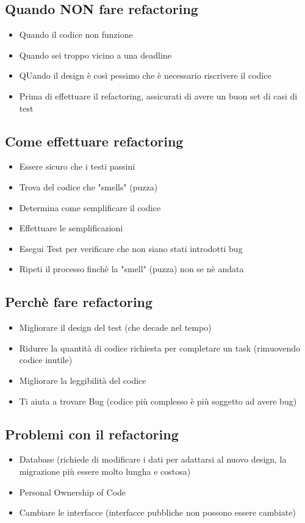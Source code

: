 \subsection{Quando NON fare refactoring}
\begin{itemize}
    \item Quando il codice non funzione
    \item Quando sei troppo vicino a una deadline
    \item QUando il design è così pessimo che è necessario riscrivere il codice
    \item Prima di effettuare il refactoring, assicurati di avere un buon set di casi di test
\end{itemize}
\subsection{Come effettuare refactoring}
\begin{itemize}
    \item Essere sicuro che i testi passini
    \item Trova del codice che "smells" (puzza)
    \item Determina come semplificare il codice
    \item Effettuare le semplificazioni
    \item Esegui Test per verificare che non siano stati introdotti bug
    \item Ripeti il processo finchè la "smell" (puzza) non se nè andata
\end{itemize}
\subsection{Perchè fare refactoring}
\begin{itemize}
    \item Migliorare il design del test (che decade nel tempo)
    \item Ridurre la quantità di codice richiesta per completare un task (rimuovendo
    codice inutile)
    \item Migliorare la leggibilità del codice
    \item Ti aiuta a trovare Bug (codice più complesso è più soggetto ad avere bug)
\end{itemize}
\subsection{Problemi con il refactoring}
\begin{itemize}
    \item Database (richiede di modificare i dati per adattarsi al nuovo design,
    la migrazione più essere molto lungha e costosa)
    \item Personal Ownership of Code
    \item Cambiare le interfacce (interfacce pubbliche non possono essere cambiate)
\end{itemize}
